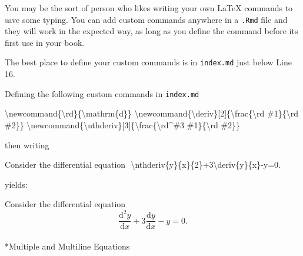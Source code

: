 \documentclass[
  letterpaper,
]{article}
\makeatletter
\let\oldparagraph\paragraph
\renewcommand{\paragraph}{
    \@ifstar
      \xxxParagraphStar
      \xxxParagraphNoStar
  }
\newcommand{\xxxParagraphStar}[1]{\oldparagraph*{#1}\mbox{}}
\newcommand{\xxxParagraphNoStar}[1]{\oldparagraph{#1}\mbox{}}
\newenvironment{Shaded}{\begin{snugshade}}{\end{snugshade}}
\newcommand{\ExtensionTok}[1]{\textcolor[rgb]{0.00,0.23,0.31}{#1}}
\newcommand{\FunctionTok}[1]{\textcolor[rgb]{0.28,0.35,0.67}{#1}}
\newcommand{\NormalTok}[1]{\textcolor[rgb]{0.00,0.23,0.31}{#1}}
\numberwithin{equation}{section}
\numberwithin{figure}{section}
\theoremstyle{break}
\makeatother
\begin{document}
You may be the sort of person who likes writing your own LaTeX commands
to save some typing. You can add custom commands anywhere in a
\texttt{.Rmd} file and they will work in the expected way, as long as
you define the command before its first use in your book.

The best place to define your custom commands is in \texttt{index.md}
just below Line 16.

Defining the following custom commands in \texttt{index.md}

\begin{Shaded}
\begin{Highlighting}[]
\FunctionTok{\textbackslash{}newcommand}\NormalTok{\{}\ExtensionTok{\textbackslash{}rd}\NormalTok{\}\{}\FunctionTok{\textbackslash{}mathrm}\NormalTok{\{d\}\}}
\FunctionTok{\textbackslash{}newcommand}\NormalTok{\{}\ExtensionTok{\textbackslash{}deriv}\NormalTok{\}[2]\{}\FunctionTok{\textbackslash{}frac}\NormalTok{\{}\FunctionTok{\textbackslash{}rd}\NormalTok{ \#1\}\{}\FunctionTok{\textbackslash{}rd}\NormalTok{ \#2\}\}}
\FunctionTok{\textbackslash{}newcommand}\NormalTok{\{}\ExtensionTok{\textbackslash{}nthderiv}\NormalTok{\}[3]\{}\FunctionTok{\textbackslash{}frac}\NormalTok{\{}\FunctionTok{\textbackslash{}rd}\NormalTok{\^{}\#3 \#1\}\{}\FunctionTok{\textbackslash{}rd}\NormalTok{ \#2\}\}}
\end{Highlighting}
\end{Shaded}

\newcommand{\rd}{\mathrm{d}}
\newcommand{\deriv}[2]{\frac{\rd #1}{\rd #2}}
\newcommand{\nthderiv}[3]{\frac{\rd^#3 #1}{\rd #2}}

then writing

\begin{Shaded}
\begin{Highlighting}[]
\NormalTok{Consider the differential equation}
\NormalTok{$$}
\NormalTok{\textbackslash{}nthderiv\{y\}\{x\}\{2\}+3\textbackslash{}deriv\{y\}\{x\}{-}y=0.}
\NormalTok{$$}
\end{Highlighting}
\end{Shaded}

yields:

Consider the differential equation \[
\frac{\mathrm{d}^2 y}{\mathrm{d}x}+3\frac{\mathrm{d}y}{\mathrm{d}x}-y=0.
\]

\paragraph*{Multiple and Multiline
Equations}\label{multiple-and-multiline-equations}
\end{document}
